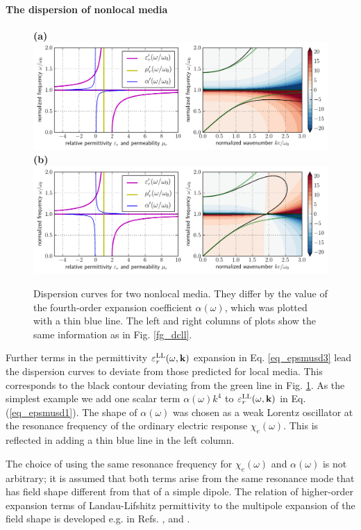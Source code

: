 \paragraph{The dispersion of nonlocal media} %
\begin{figure}[t] \caption{Dispersion curves for two nonlocal media. They differ by the value of the fourth-order expansion coefficient $\alpha(\omega)$, which was plotted with a thin blue line. The left and right columns of plots show the same information as in Fig. \ref{fg_dcll}.  } \label{fg_dcll_nl} \centering  
\textbf{(a)}\\	\includegraphics[width=1\textwidth]{img/dispersion_landau_lifshitz/dispersion_ll_quadrupp.pdf}
\textbf{(b)}\\	\includegraphics[width=1\textwidth]{img/dispersion_landau_lifshitz/dispersion_ll_quadrupn.pdf}
\end{figure}

Further terms in the permittivity $\varepsilon_r^\text{LL}(\omega,{\mathbf{k}})$ expansion in Eq. \ref{eq_epsmusd3} lead the dispersion curves to deviate from those predicted for local media. This corresponds to the black contour deviating from the green line in Fig. \ref{fg_dcll_nl}.
As the simplest example we add one scalar term $\alpha(\omega) k^4$ to $\varepsilon_r^\text{LL}(\omega,{\mathbf{k}})$ in Eq. (\ref{eq_epsmusd1}). The shape of $\alpha(\omega)$  was chosen as a weak Lorentz oscillator at the resonance frequency of the ordinary electric response $\chi_e(\omega)$. This is reflected in adding a thin blue line in the left column.

The choice of using the same resonance frequency for $\chi_e(\omega)$ and $\alpha(\omega)$ is not arbitrary; it is assumed that both terms arise from the same resonance mode that has field shape different from that of a simple dipole. The relation of higher-order expansion terms of Landau-Lifshitz permittivity  to the multipole expansion of the field shape is developed e.g. in Refs. \cite{agranovich2006spatial}, \cite{vinogradov2002form} and \cite{fietz2011homogenization}.

